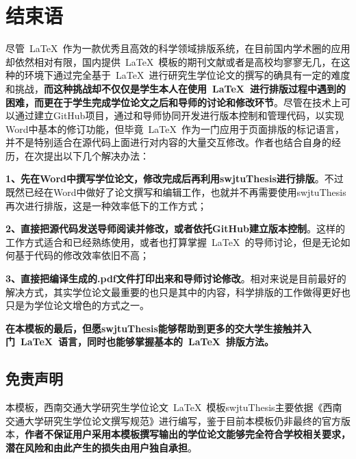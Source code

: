 \chapter{结束语}

尽管~\LaTeX{}~作为一款优秀且高效的科学领域排版系统，在目前国内学术圈的应用却依然相对有限，国内提供~\LaTeX{}~模板的期刊文献或者是高校均寥寥无几，在这种的环境下通过完全基于~\LaTeX{}~进行研究生学位论文的撰写的确具有一定的难度和挑战，\textbf{而这种挑战却不仅仅是学生本人在使用~\LaTeX{}~进行排版过程中遇到的困难，而更在于学生完成学位论文之后和导师的讨论和修改环节}。尽管在技术上可以通过建立GitHub项目，通过和导师协同开发进行版本控制和管理代码，以实现Word中基本的修订功能，但毕竟~\LaTeX{}~作为一门应用于页面排版的标记语言，并不是特别适合在源代码上面进行对内容的大量交互修改。作者也结合自身的经历，在次提出以下几个解决办法：

\par
\textbf{1、先在Word中撰写学位论文，修改完成后再利用swjtuThesis进行排版}。不过既然已经在Word中做好了论文撰写和编辑工作，也就并不再需要使用swjtuThesis再次进行排版，这是一种效率低下的工作方式；

\par
\textbf{2、直接把源代码发送导师阅读并修改，或者依托GitHub建立版本控制}。这样的工作方式适合和已经熟练使用，或者也打算掌握~\LaTeX{}~的导师讨论，但是无论如何基于代码的修改效率依旧不高；

\par
\textbf{3、直接把编译生成的.pdf文件打印出来和导师讨论修改}。相对来说是目前最好的解决方式，其实学位论文最重要的也只是其中的内容，科学排版的工作做得更好也只是为学位论文增色的方式之一。

\par
\textbf{在本模板的最后，但愿swjtuThesis能够帮助到更多的交大学生接触并入门~\LaTeX{}~语言，同时也能够掌握基本的~\LaTeX{}~排版方法。}

\section{免责声明}
本模板，西南交通大学研究生学位论文~\LaTeX{}~模板swjtuThesis主要依据《西南交通大学研究生学位论文撰写规范》进行编写，鉴于目前本模板仍非最终的官方版本，\textbf{作者不保证用户采用本模板撰写输出的学位论文能够完全符合学校相关要求，潜在风险和由此产生的损失由用户独自承担}。

